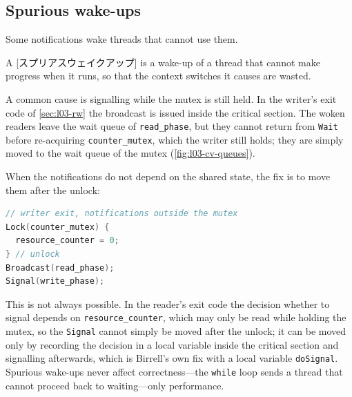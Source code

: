 \documentclass[../main.tex]{subfiles}
\begin{document}
\subsection{Spurious wake-ups}

Some notifications wake threads that cannot use them.

\begin{definition}
  A [スプリアスウェイクアップ] is a wake-up of a
  thread that cannot make progress when it runs, so that the context switches
  it causes are wasted.
\end{definition}

A common cause is signalling while the mutex is still held.  In the writer's exit code of \cref{sec:l03-rw} the
broadcast is issued inside the critical section.  The woken readers leave the
wait queue of \texttt{read\_phase}, but they cannot return from
\texttt{Wait} before re-acquiring \texttt{counter\_mutex}, which the writer
still holds; they are simply moved to the wait queue of the mutex
(\cref{fig:l03-cv-queues}).

When the notifications do not depend on the shared state, the fix is to
move them after the unlock:

\begin{lstlisting}[language=C, numbers=none]
// writer exit, notifications outside the mutex
Lock(counter_mutex) {
  resource_counter = 0;
} // unlock
Broadcast(read_phase);
Signal(write_phase);
\end{lstlisting}

This is not always possible.  In the reader's exit code the decision whether
to signal depends on \texttt{resource\_counter}, which may only be read while
holding the mutex, so the \texttt{Signal} cannot simply be moved after the
unlock; it can be moved only by recording the decision in a local variable
inside the critical section and signalling afterwards, which is Birrell's
own fix with a local variable \texttt{doSignal}.  Spurious wake-ups
never affect correctness---the \texttt{while} loop sends a thread that cannot
proceed back to waiting---only performance.
\end{document}
